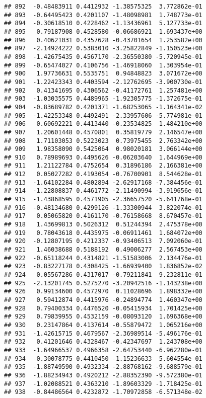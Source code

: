 \documentclass[
]{article}
\begin{document}
\begin{verbatim}
## 892  -0.48483911 0.4412932 -1.38575325  3.772862e-01
## 893  -0.64495423 0.4201107 -1.48098981  1.748773e-01
## 894  -0.30618510 0.4228462 -1.13436961  5.127733e-01
## 895   0.79187908 0.4528580 -0.06686921  1.693437e+00
## 896   0.40621031 0.4357628 -0.43701654  1.253582e+00
## 897  -2.14924222 0.5383010 -3.25822849 -1.150523e+00
## 898  -1.42675435 0.4567170 -2.36550380 -5.720945e-01
## 899  -0.65474027 0.4106756 -1.46918060  1.303954e-01
## 900   1.97736631 0.5535751  0.94848823  3.071672e+00
## 901  -1.22423343 0.4403594 -2.12762695 -3.900730e-01
## 902   0.41341695 0.4306562 -0.41172761  1.257481e+00
## 903  -1.03035575 0.4489965 -1.92305775 -1.372675e-01
## 904  -0.83689782 0.4201371 -1.68253065 -1.164341e-02
## 905  -1.42253348 0.4492491 -2.33957606 -5.774981e-01
## 906   0.60692221 0.4413440 -0.23534825  1.484210e+00
## 907   1.20601448 0.4570801  0.35819779  2.146547e+00
## 908   1.71103053 0.5223023  0.73975455  2.763342e+00
## 909   1.98358090 0.5425064  0.98020181  3.066144e+00
## 910   0.78989693 0.4495626 -0.06203640  1.644969e+00
## 911   1.21122784 0.4752654  0.31896186  2.166381e+00
## 912   0.05027282 0.4193054 -0.76700901  8.544628e-01
## 913  -1.64102284 0.4802894 -2.62917168 -7.384456e-01
## 914  -1.22808837 0.4461772 -2.11490994 -3.919656e-01
## 915  -1.43868595 0.4571905 -2.36657520 -5.641768e-01
## 916  -0.48134680 0.4299126 -1.33300944  3.822074e-01
## 917   0.05065820 0.4161170 -0.76158668  8.670457e-01
## 918   1.43699813 0.5026312  0.51244394  2.475378e+00
## 919   0.78043618 0.4435975 -0.06911461  1.684072e+00
## 920  -0.12807195 0.4212337 -0.93406513  7.092060e-01
## 921   1.46038688 0.5188192  0.49006277  2.567453e+00
## 922  -0.65118244 0.4314821 -1.51583006  2.134476e-01
## 923  -0.83227178 0.4308425 -1.66939400  1.836852e-02
## 924   0.05567286 0.4317017 -0.79211841  9.232811e-01
## 925  -2.13201745 0.5275270 -3.20942516 -1.143238e+00
## 926   0.99134600 0.4572970  0.11028696  1.898332e+00
## 927   0.59412874 0.4415976 -0.24894774  1.460347e+00
## 928   0.79400334 0.4476520 -0.05415934  1.701425e+00
## 929   0.79839955 0.4532159 -0.08093120  1.696368e+00
## 930   0.23147864 0.4137614 -0.55879472  1.065216e+00
## 931  -1.42615715 0.4679567 -2.36989514 -5.496176e-01
## 932   0.41201646 0.4328467 -0.42347697  1.243708e+00
## 933  -1.64966537 0.4966358 -2.64753440 -6.962280e-01
## 934  -0.30078775 0.4410450 -1.15236633  5.604554e-01
## 935  -1.88749590 0.4932334 -2.88768162 -9.688579e-01
## 936  -1.88234943 0.4920212 -2.88352390 -9.572380e-01
## 937  -1.02088521 0.4363210 -1.89603329 -1.718425e-01
## 938  -0.84486564 0.4232872 -1.70972858 -6.571348e-02

\end{verbatim}
\end{document}
